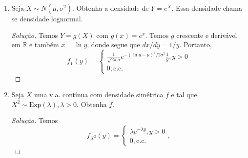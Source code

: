 \documentclass[../Notas.tex]{subfiles}
\begin{document}
\begin{enumerate}
\begin{enumerate}[a)]
    \item $Y = |X|$;
    \item $Y = X^2$.
    \end{enumerate}
    \begin{proof}[Solução]
        \begin{enumerate}[a)]
            \item Do exercício anterior,
            \[
            f_Y(y) = \begin{cases}
            \frac{2}{\sqrt{2\pi}\sigma}e^{-y^2/2\sigma^2}, y>0 \\
            0, \text{c.c.}
            \end{cases}
            \]
            \item Temos
            \[
            f_Y(y) = \begin{cases}
            \frac{(1/2\sigma^2)^{1/2}}{\sqrt{\pi}}y^{-1/2}e^{-y/2\sigma^2}, y>0 \\
            0, \text{c.c.}
            \end{cases},
            \]
            ou seja, $Y\sim\text{Gama}(1/2, 1/2\sigma^2)$.
        \end{enumerate}
    \end{proof}
    \item Seja $X\sim N(\mu, \sigma^2)$. Obtenha a densidade de $Y = e^X$. Essa densidade chama-se densidade lognormal.
    \begin{proof}[Solução]
        Temos $Y=g(X)$ com $g(x) = e^x$. Temos $g$ crescente e derivável em $\mathbb{R}$ e também
        $x = \ln y$, donde segue que $dx/dy = 1/y$. Portanto,
        \[
        f_Y(y) = \begin{cases}
        \frac{1}{\sqrt{2\pi}\sigma}e^{-(\ln y - \mu)^2/2\sigma^2}\frac{1}{y}, y > 0 \\
        0, \text{c.c.}
        \end{cases}
        \]
    \end{proof}
    \item Seja $X$ uma v.a. contínua com densidade simétrica $f$ e tal que $X^2 \sim\text{Exp}(\lambda), \lambda > 0$. Obtenha $f$.
    \begin{proof}[Solução]
        Temos
        \[
        f_{X^2}(y) = \begin{cases}
        \lambda e^{-\lambda y}, y > 0 \\
        0, \text{c.c.}
        \end{cases},
\]
\end{proof}
\end{enumerate}
\end{document}
